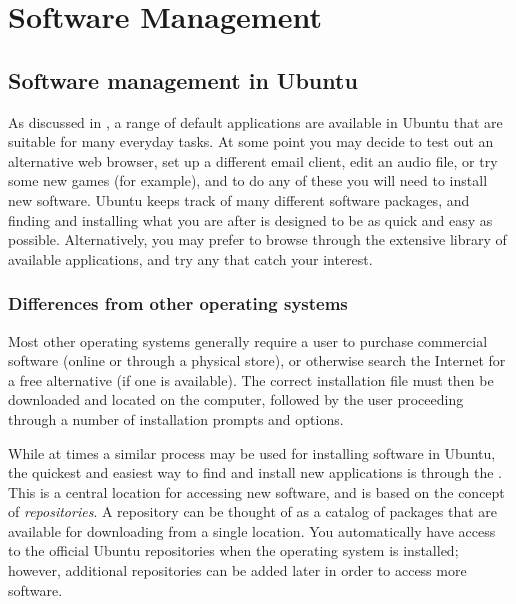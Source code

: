 

\chapter{Software Management}
\label{ch:software-management}

\section{Software management in Ubuntu}

As discussed in , a range of default applications are available in Ubuntu that are suitable for many everyday tasks. At some point you may decide to test out an alternative web browser, set up a different email client, edit an audio file, or try some new games (for example), and to do any of these you will need to install new software. Ubuntu keeps track of many different software \glspl{package}, and finding and installing what you are after is designed to be as quick and easy as possible. Alternatively, you may prefer to browse through the extensive library of available applications, and try any that catch your interest.

\subsection{Differences from other operating systems}

Most other operating systems generally require a user to purchase commercial software (online or through a physical store), or otherwise search the Internet for a free alternative (if one is available). The correct installation file must then be downloaded and located on the computer, followed by the user proceeding through a number of installation prompts and options.

While at times a similar process may be used for installing software in Ubuntu, the quickest and easiest way to find and install new applications is through the . This is a central location for accessing new software, and is based on the concept of \emph{repositories}. A repository can be thought of as a catalog of packages that are available for downloading from a single location. You automatically have access to the official Ubuntu repositories when the operating system is installed; however, additional repositories can be added later in order to access more software.

